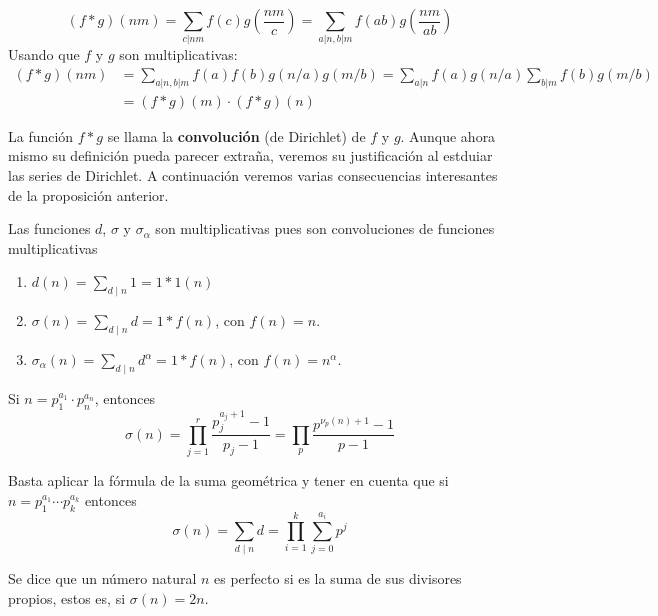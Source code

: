 \documentclass[TAN.tex]{subfiles}
\begin{document}
\begin{dem}
\[ (f*g)(nm) = \sum_{c|nm}f(c)g\left(\frac{nm}{c}\right) = \sum_{a|n,b|m}f(ab)g\left(\frac{nm}{ab}\right) \]
Usando que $f$ y $g$ son multiplicativas:
\begin{align*}
	(f*g)(nm) & = \sum_{a|n,b|m} f(a)f(b)g(n/a)g(m/b)  = \sum_{a|n}f(a)g(n/a) \sum_{b|m}f(b)g(m/b) \\
	& = (f*g)(m) \cdot (f*g)(n)
\end{align*}
\QED
\end{dem}

La función $f * g$ se llama la \textbf{convolución} (de Dirichlet) de $f$ y $g$.
Aunque ahora mismo su definición pueda parecer extraña, veremos su justificación al estduiar las series de Dirichlet.
A continuación veremos varias consecuencias interesantes de la proposición anterior.

\begin{ejs}
Las funciones $d$, $σ$ y $σ_α$ son multiplicativas pues son convoluciones de funciones multiplicativas
\begin{enumerate}
\item $d(n) =\sum_{d\mid n} 1 = 1 \ast 1 (n)$
\item $\sigma(n)= \sum_{d\mid n} d = 1 \ast f (n)$, con $f(n)=n$.
\item $\sigma_\alpha (n) = \sum_{d\mid n} d^\alpha = 1 \ast f (n)$, con $f(n)=n^\alpha$.
\end{enumerate}
\end{ejs}

\begin{prop}
Si $n = p_1^{a_1} \cdot p_n^{a_n}$, entonces
\[ σ(n) = \prod_{j=1}^r \frac{p_j^{a_j+1}-1}{p_j-1} = \prod_p \frac{p^{ν_p(n)+1}-1}{p-1} \]
\end{prop}
\begin{dem}
Basta aplicar la fórmula de la suma geométrica y tener en cuenta que si $n=p_1^{a_1}\cdots p_k^{a_k}$ entonces
$$\sigma(n) = \sum_{d\mid n} d = \prod_{i=1}^k \sum_{j=0}^{a_i} p^j$$
\end{dem}
\begin{defi}
Se dice que un número natural $n$ es perfecto si es la suma de sus divisores propios, estos es, si $σ(n)=2n$.
\end{defi}
\end{document}

